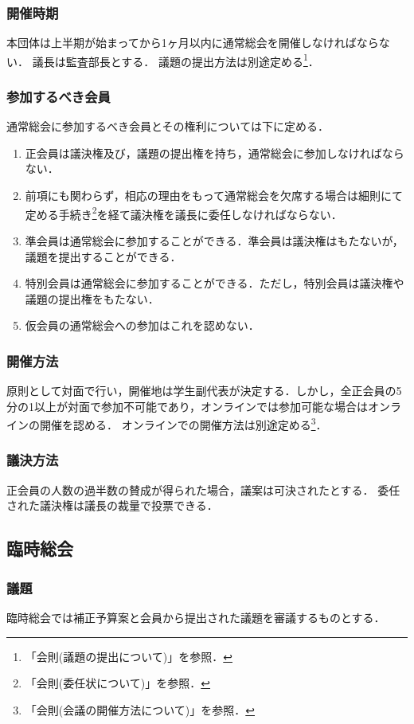 \documentclass{ltjsarticle}
\begin{document}
      \subsubsection{開催時期}
        \jor
        本団体は上半期が始まってから1ヶ月以内に通常総会を開催しなければならない．
        議長は監査部長とする．
        議題の提出方法は別途定める\footnote{「会則(議題の提出について)」を参照．}．
      \subsubsection{参加するべき会員}
        \jor
        通常総会に参加するべき会員とその権利については下に定める．
        \begin{enumerate}
          \item 正会員は議決権及び，議題の提出権を持ち，通常総会に参加しなければならない．
          \item 前項にも関わらず，相応の理由をもって通常総会を欠席する場合は細則にて定める手続き\footnote{「会則(委任状について)」を参照．}を経て議決権を議長に委任しなければならない．  
          \item 準会員は通常総会に参加することができる．準会員は議決権はもたないが，議題を提出することができる．
          \item 特別会員は通常総会に参加することができる．ただし，特別会員は議決権や議題の提出権をもたない．
          \item 仮会員の通常総会への参加はこれを認めない．
        \end{enumerate}
      \subsubsection{開催方法}
        \jor
        原則として対面で行い，開催地は学生副代表が決定する．しかし，全正会員の5分の1以上が対面で参加不可能であり，オンラインでは参加可能な場合はオンラインの開催を認める．
        オンラインでの開催方法は別途定める\footnote{「会則(会議の開催方法について)」を参照．}．
      \subsubsection{議決方法}
        \jor
        正会員の人数の過半数の賛成が得られた場合，議案は可決されたとする．
        委任された議決権は議長の裁量で投票できる．
    \subsection{臨時総会}\label{cab}
      \subsubsection{議題}
        臨時総会では補正予算案と会員から提出された議題を審議するものとする．
\end{document}
